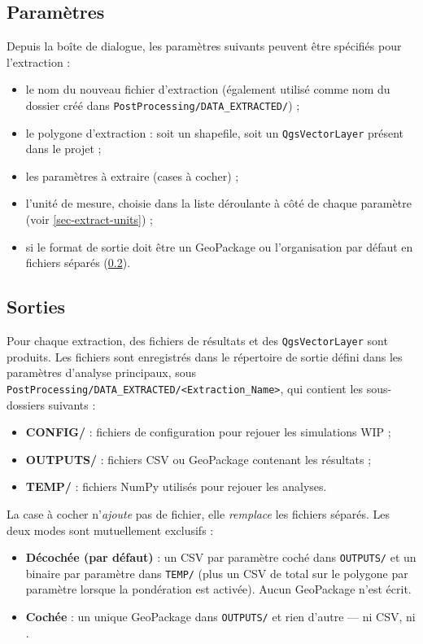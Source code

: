 \subsection{Paramètres}
\label{sec-extract-params}
Depuis la boîte de dialogue, les paramètres suivants peuvent être spécifiés pour l'extraction :
\begin{itemize}
    \item le nom du nouveau fichier d'extraction (également utilisé comme nom du dossier créé dans \texttt{PostProcessing/DATA\_EXTRACTED/}) ;
    \item le polygone d'extraction : soit un shapefile, soit un \texttt{QgsVectorLayer} présent dans le projet ;
    \item les paramètres à extraire (cases à cocher) ;
    \item l'unité de mesure, choisie dans la liste déroulante à côté de chaque paramètre (voir \cref{sec-extract-units}) ;
    \item si le format de sortie doit être un GeoPackage ou l'organisation par défaut en fichiers séparés (\cref{sec-extract-outputs}).
\end{itemize}

\subsection{Sorties}
\label{sec-extract-outputs}
Pour chaque extraction, des fichiers de résultats et des \texttt{QgsVectorLayer} sont produits. Les fichiers sont enregistrés dans le répertoire de sortie défini dans les paramètres d'analyse principaux, sous \texttt{PostProcessing/DATA\_EXTRACTED/<Extraction\_Name>}, qui contient les sous-dossiers suivants :
\begin{itemize}
    \item \textbf{CONFIG/} : fichiers de configuration pour rejouer les simulations WIP ;
    \item \textbf{OUTPUTS/} : fichiers CSV ou GeoPackage contenant les résultats ;
    \item \textbf{TEMP/} : fichiers NumPy utilisés pour rejouer les analyses.
\end{itemize}

La case à cocher  n'\emph{ajoute} pas de fichier, elle \emph{remplace} les fichiers séparés. Les deux modes sont mutuellement exclusifs :
\begin{itemize}
    \item \textbf{Décochée (par défaut)} : un CSV par paramètre coché dans \texttt{OUTPUTS/} et un binaire  par paramètre dans \texttt{TEMP/} (plus un CSV de total sur le polygone par paramètre lorsque la pondération est activée). Aucun GeoPackage n'est écrit.
    \item \textbf{Cochée} : un unique GeoPackage dans \texttt{OUTPUTS/} et rien d'autre --- ni CSV, ni .
\end{itemize}

